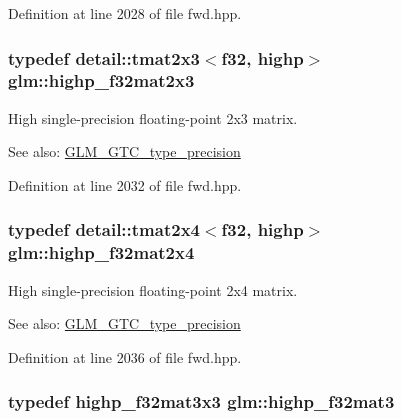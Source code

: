 Definition at line 2028 of file fwd.hpp.\hypertarget{group__gtc__type__precision_g53613c1b93f81207065a8a935ff02a81}{
\subsubsection[highp\_\-f32mat2x3]{\setlength{\rightskip}{0pt plus 5cm}typedef detail::tmat2x3$<$f32, highp$>$ {\bf glm::highp\_\-f32mat2x3}}}
\label{group__gtc__type__precision_g53613c1b93f81207065a8a935ff02a81}


High single-precision floating-point 2x3 matrix. \begin{Desc}
\item[See also:]\hyperlink{group__gtc__type__precision}{GLM\_\-GTC\_\-type\_\-precision} \end{Desc}


Definition at line 2032 of file fwd.hpp.\hypertarget{group__gtc__type__precision_g9689dbe21bc976ca8069c63300b5887e}{
\subsubsection[highp\_\-f32mat2x4]{\setlength{\rightskip}{0pt plus 5cm}typedef detail::tmat2x4$<$f32, highp$>$ {\bf glm::highp\_\-f32mat2x4}}}
\label{group__gtc__type__precision_g9689dbe21bc976ca8069c63300b5887e}


High single-precision floating-point 2x4 matrix. \begin{Desc}
\item[See also:]\hyperlink{group__gtc__type__precision}{GLM\_\-GTC\_\-type\_\-precision} \end{Desc}


Definition at line 2036 of file fwd.hpp.\hypertarget{group__gtc__type__precision_g06809818db73785334f839742a9ad85a}{
\subsubsection[highp\_\-f32mat3]{\setlength{\rightskip}{0pt plus 5cm}typedef highp\_\-f32mat3x3 {\bf glm::highp\_\-f32mat3}}}
\label{group__gtc__type__precision_g06809818db73785334f839742a9ad85a}


